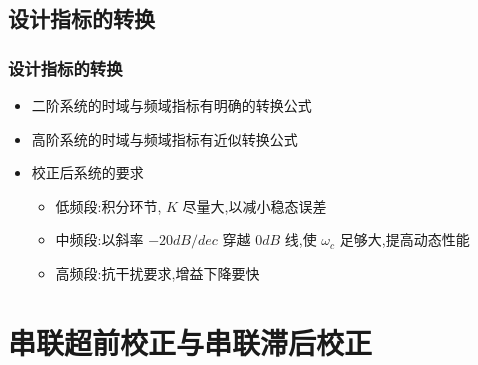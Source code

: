 \documentclass[table]{article}
\begin{document}
\subsection{设计指标的转换}
\label{sec-1-2}
\begin{frame}
\frametitle{设计指标的转换}
\label{sec-1-2-1}

\begin{itemize}
\item <2->二阶系统的时域与频域指标有明确的转换公式
\item <3->高阶系统的时域与频域指标有近似转换公式
\item <4->校正后系统的要求
\begin{itemize}
\item <4->低频段:积分环节, $K$ 尽量大,以减小稳态误差
\item <5->中频段:以斜率 $-20dB/dec$ 穿越 $0dB$ 线,使 $\omega_c$ 足够大,提高动态性能
\item <6->高频段:抗干扰要求,增益下降要快
\end{itemize}
\end{itemize}
\end{frame}
\section{串联超前校正与串联滞后校正}
\label{sec-2}
\end{document}
